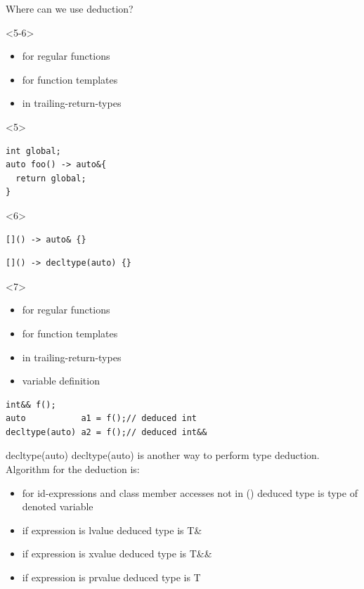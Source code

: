 \documentclass[10pt]{beamer}
\begin{document}
\begin{frame}[fragile]{Where can we use deduction?}
\begin{onlyenv}
	\end{onlyenv}


	\begin{onlyenv}<5-6>
		\begin{itemize}
			\item for regular functions
			\item for function templates
			\item \alert{in trailing-return-types}
		\end{itemize}

		\vfill
	\end{onlyenv}
	
	\begin{onlyenv}
	\begin{verbatim}
int global;	
auto foo() -> auto&{
  return global;
}		
\end{verbatim}
	\end{onlyenv}

	\begin{onlyenv}
	\begin{verbatim}
[]() -> auto& {}	
	\end{verbatim}
	\begin{verbatim}
[]() -> decltype(auto) {}	
	\end{verbatim}
	\end{onlyenv}

	\begin{onlyenv}
		\begin{itemize}
			\item for regular functions
			\item for function templates
			\item in trailing-return-types
			\item \alert{variable definition}
		\end{itemize}
	
		\begin{verbatim}
int&& f();
auto           a1 = f();// deduced int
decltype(auto) a2 = f();// deduced int&&		
		\end{verbatim}
	\end{onlyenv}

\end{frame}


\begin{frame}[fragile]{decltype(auto)}
	\centering \alert{decltype(auto)} is another way to perform type deduction. \\
	Algorithm for the deduction is:
	\begin{itemize}[<+- |alert@+>]
		\item for id-expressions and class member accesses not in () deduced type is type of denoted variable
		\item if expression is lvalue deduced type is T\&
		\item if expression is xvalue deduced type is T\&\&
		\item if expression is prvalue deduced type is T
	\end{itemize}
\end{frame}
\end{document}
